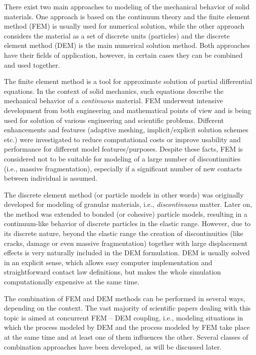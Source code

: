 There exist two main approaches to modeling of the mechanical behavior of solid materials.
One approach is based on the continuum theory and the finite element method (FEM) is usually used for numerical solution, while the other approach considers the material as a set of discrete units (particles) and the discrete element method (DEM) is the main numerical solution method.
Both approaches have their fields of application, however, in certain cases they can be combined and used together.

The finite element method is a tool for approximate solution of partial differential equations.
In the context of solid mechanics, such equations describe the mechanical behavior of a \emph{continuous} material.
FEM underwent intensive development from both engineering and mathematical points of view and is being used for solution of various engineering and scientific problems.
Different enhancements and features (adaptive meshing, implicit/explicit solution schemes etc.) were investigated to reduce computational costs or improve usability and performance for different model features/purposes.
Despite these facts, FEM is considered not to be suitable for modeling of a large number of discontinuities (i.e., massive fragmentation), especially if a significant number of new contacts between individual  is assumed.

The discrete element method (or particle models in other words) was originally developed for modeling of granular materials, i.e., \emph{discontinuous} matter.
Later on, the method was extended to bonded (or cohesive) particle models, resulting in a continuum-like behavior of discrete particles in the elastic range.
However, due to its discrete nature, beyond the elastic range the creation of discontinuities (like cracks, damage or even massive fragmentation) together with large displacement effects is very naturally included in the DEM formulation.
DEM is usually solved in an explicit sense, which allows easy computer implementation and straightforward contact law definitions, but makes the whole simulation computationally expensive at the same time.

The combination of FEM and DEM methods can be performed in several ways, depending on the context.
The vast majority of scientific papers dealing with this topic is aimed at concurrent FEM -- DEM coupling, i.e., modeling situations in which the process modeled by DEM and the process modeled by FEM take place at the same time and at least one of them influences the other.
Several classes of combination approaches have been developed, as will be discussed later.

